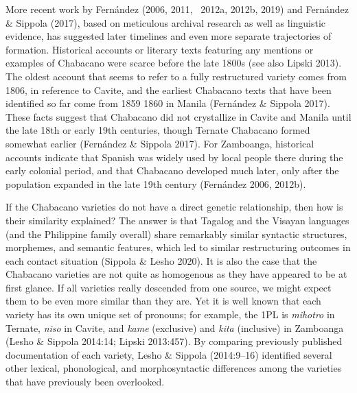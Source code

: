 \documentclass[12pt]{article}
\newenvironment{styleStandard}{\setlength\leftskip{0cm}\setlength\rightskip{0cm plus 1fil}\setlength\parindent{0cm}\setlength\parfillskip{0pt plus 1fil}\setlength\parskip{0in plus 1pt}\writerlistparindent\writerlistleftskip\leavevmode\normalfont\normalsize\writerlistlabel\ignorespaces}{\unskip\vspace{0.111in plus 0.0111in}\par}
\newcommand\writerlistleftskip{}
\newcommand\writerlistparindent{}
\newcommand\writerlistlabel{}
\begin{document}
\begin{styleStandard}
More recent work by Fernández (2006, 2011, \ 2012a, 2012b, 2019) and Fernández \& Sippola (2017), based on meticulous archival research as well as linguistic evidence, has suggested later timelines and even more separate trajectories of formation. Historical accounts or literary texts featuring any mentions or examples of Chabacano were scarce before the late 1800s (see also Lipski 2013). The oldest account that seems to refer to a fully restructured variety comes from 1806, in reference to Cavite, and the earliest Chabacano texts that have been identified so far come from 1859 1860 in Manila (Fernández \& Sippola 2017). These facts suggest that Chabacano did not crystallize in Cavite and Manila until the late 18th or early 19th centuries, though Ternate Chabacano formed somewhat earlier (Fernández \& Sippola 2017). For Zamboanga, historical accounts indicate that Spanish was widely used by local people there during the early colonial period, and that Chabacano developed much later, only after the population expanded in the late 19th century (Fernández 2006, 2012b). 
\end{styleStandard}

\begin{styleStandard}
If the Chabacano varieties do not have a direct genetic relationship, then how is their similarity explained? The answer is that Tagalog and the Visayan languages (and the Philippine family overall) share remarkably similar syntactic structures, morphemes, and semantic features, which led to similar restructuring outcomes in each contact situation (Sippola \& Lesho 2020). It is also the case that the Chabacano varieties are not quite as homogenous as they have appeared to be at first glance. If all varieties really descended from one source, we might expect them to be even more similar than they are. Yet it is well known that each variety has its own unique set of pronouns; for example, the 1PL is \textit{mihotro} in Ternate, \textit{niso} in Cavite, and \textit{kame} (exclusive) and \textit{kita} (inclusive) in Zamboanga (Lesho \& Sippola 2014:14; Lipski 2013:457). By comparing previously published documentation of each variety, Lesho \& Sippola (2014:9–16) identified several other lexical, phonological, and morphosyntactic differences among the varieties that have previously been overlooked. 
\end{styleStandard}
\end{document}
